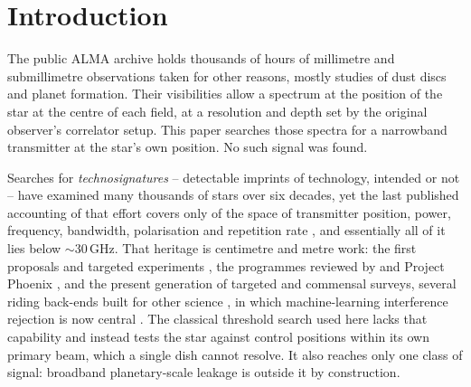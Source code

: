 \section{Introduction}
\label{sec:intro}

The public ALMA archive holds thousands of hours of millimetre and
submillimetre observations taken for other reasons, mostly studies of dust
discs and planet formation. Their visibilities allow a spectrum at the
position of the star at the centre of each field, at a resolution and depth
set by the original observer's correlator setup. This paper searches those
spectra for a narrowband transmitter at the star's own position. No such
signal was found.

Searches for \emph{technosignatures} -- detectable imprints of technology,
intended or not
\citep{Sheikh2020,SETIreview2025} -- have examined many thousands of stars
over six decades, yet the last published accounting of that effort covers
only \HaystackFrac{} of the space of transmitter position, power, frequency,
bandwidth, polarisation and repetition rate
\citep{Wright2018}, and essentially all of it lies below
${\sim}30$\,GHz. That heritage is centimetre and metre work: the first
proposals and targeted experiments
\citep{CocconiMorrison1959,Drake1960}, the programmes reviewed by
\citet{Tarter2001} and Project Phoenix \citep{Backus2002}, and the present
generation of targeted and commensal surveys, several riding back-ends built
for other science
\citep{Zhang2020,Czech2021,FAST3IATLAS2025,LOFARdualsite2023,Choza2024,Morrison2023,Tremblay2024,SRT2025},
in which machine-learning interference rejection is now central
\citep{Ma2023,GLOBULAR2025,AnomalyParkesGBT2025}. The classical threshold
search used here lacks that capability and instead tests the star against
control positions within its own primary beam, which a single dish cannot
resolve. It also reaches only one class of signal: broadband
planetary-scale leakage \citep{BRaTs2026} is outside it by construction.

